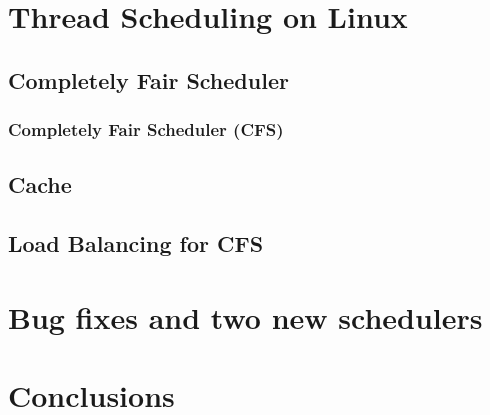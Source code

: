 \documentclass{beamer}
\begin{document}
\section[Thread Scheduling]{Thread Scheduling on Linux}
\subsection[CFS]{Completely Fair Scheduler}
\begin{frame}
\frametitle{Completely Fair Scheduler (CFS)}


\end{frame}



\subsection[CFS]{Cache}
\begin{frame}
\end{frame}
\subsection[Load Balancing]{Load Balancing for CFS}
\begin{frame}
\end{frame}
\section[Bug Fixes and New Schedulers]{Bug fixes and two new schedulers}
\begin{frame}
\end{frame}

\section[Conclusions]{Conclusions}
\end{document}
